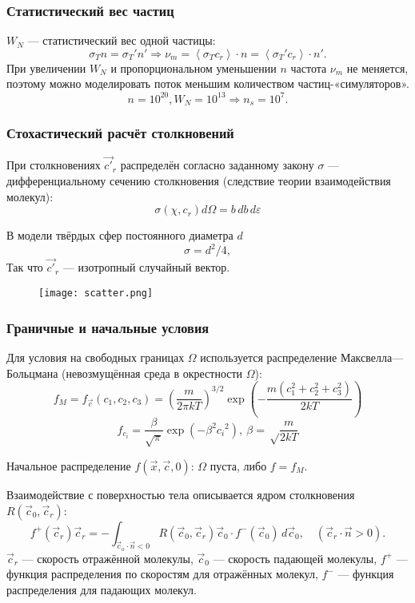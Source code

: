 \documentclass[onlymath]{beamer}
\newcommand\avg[1]{\left\langle{#1}\right\rangle}
\renewcommand\epsilon\varepsilon
\newcommand{\statw}{W_N}
\newcommand\dom{\Omega}
\newcommand{\cf}{\nu_m}
\newcommand{\ccs}{\sigma_T}
\newcommand\then{\Rightarrow}
\begin{document}
\begin{frame}
  \frametitle{Статистический вес частиц}
  $\statw$ — статистический вес одной частицы:
  \begin{equation*}
    \ccs n = \ccs' n' \then \cf = \avg{\ccs c_r} \cdot n = \avg{\ccs' c_r} \cdot n'.
  \end{equation*}
  При увеличении $\statw$ и пропорциональном уменьшении $n$ частота
  $\cf$ не меняется, поэтому можно моделировать поток меньшим
  количеством частиц-«симуляторов».
  \begin{equation*}
    n = 10^{20}, W_N = 10^{13} \then n_s = 10^7.
  \end{equation*}
\end{frame}

\begin{frame}
  \frametitle{Стохастический расчёт столкновений}
  При столкновениях $\vec{c'}_r$ распределён согласно заданному закону
  $\sigma$ — дифференциальному сечению столкновения (следствие теории
  взаимодействия молекул):
  \begin{equation*}
    \sigma(\chi,c_r) d\Omega = b\,db\,d\epsilon
  \end{equation*}

  В модели твёрдых сфер постоянного диаметра $d$
  \begin{equation*}
    \sigma = d^2/4,
  \end{equation*}
  Так что $\vec{c'}_r$ — изотропный случайный вектор.
  \begin{figure}[!h]
    \centering
    \texttt{[image: scatter.png]}
  \end{figure}
\end{frame}

\begin{frame}
  \frametitle{Граничные и начальные условия}
  Для условия на свободных границах $\dom$ используется распределение
  Максвелла—Больцмана (невозмущённая среда в окрестности $\dom$):
  \begin{equation*}
    \label{eq:maxwell-boltzmann}
    f_M = f_{\vec{c}}(c_1, c_2, c_3) = \left(\frac{m}{2\pi k T}\right)^{3/2}
    \exp\left(-\frac{m(c_1^2 + c_2^2 +c_3^2)}{2kT}\right)
  \end{equation*}
  \begin{equation*}
    \label{eq:maxwell-boltzmann-component}
    f_{c_i} = \frac{\beta}{\sqrt{\pi}}\exp(-\beta^2{c_i}^2),\:  \beta = \sqrt\frac{m}{2kT}
  \end{equation*}
  
  Начальное распределение $f(\vec{x}, \vec{c}, 0)$: $\dom$ пуста, либо
  $f = f_M$.
  
  Взаимодействие с поверхностью тела описывается ядром столкновения
  $R(\vec{c}_0, \vec{c}_r)$:
  \begin{equation*}
    f^+(\vec{c}_r) \vec{c}_r = -\int_{\vec{c}_o \cdot
      \vec{n} < 0}{R(\vec{c}_0, \vec{c}_r)}\vec{c}_0 \cdot
    f^-(\vec{c}_0)\,d\vec{c}_0,\quad(\vec{c}_r\cdot\vec{n}>0).
  \end{equation*}
  $\vec{c}_r$ — скорость отражённой молекулы, $\vec{c}_0$ — скорость
  падающей молекулы, $f^+$ — функция распределения по скоростям для
  отражённых молекул, $f^-$ — функция распределения для падающих
  молекул.
\end{frame}
\end{document}
